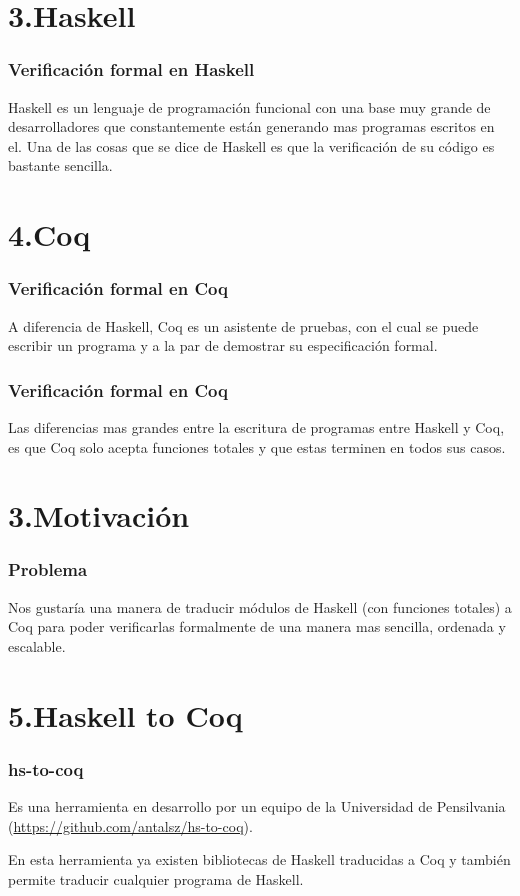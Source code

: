 \documentclass[xcolor=dvipsnames,table,handout]{beamer}
\begin{document}
\section{3.Haskell}
\begin{frame}
  \frametitle{Verificación formal en Haskell}
    Haskell es un lenguaje de programaci\'on funcional con una base muy grande 
de desarrolladores que constantemente están generando mas programas escritos en 
el.
\vspace*{10pt}
    \newline Una de las cosas que se dice de Haskell es que la verificación de 
su código es bastante sencilla.

\newline{}
\end{frame}

\section{4.Coq}
\begin{frame}
  \frametitle{Verificación formal en Coq}
	A diferencia de Haskell, Coq es un asistente de pruebas, con el cual se 
puede escribir un programa y a la par de demostrar su especificación formal.
\end{frame}

\begin{frame}
  \frametitle{Verificación formal en Coq}
    Las diferencias mas grandes entre la escritura de programas entre Haskell y 
Coq, es que Coq solo acepta funciones totales y que estas terminen en todos sus 
casos.
\end{frame}
\section{3.Motivación}
\begin{frame}
  \frametitle{Problema}
       Nos gustaría una manera de traducir módulos de Haskell (con funciones 
totales) a Coq para poder verificarlas formalmente de una manera mas sencilla, 
ordenada y escalable.
\end{frame}
\section{5.Haskell to Coq}
\begin{frame}
  \frametitle{hs-to-coq}
       Es una herramienta en desarrollo por un equipo de la Universidad de 
Pensilvania (\url{https://github.com/antalsz/hs-to-coq}).

       En esta herramienta ya existen bibliotecas de Haskell traducidas a Coq y 
también permite traducir cualquier programa de Haskell.
\end{frame}
\end{document}
